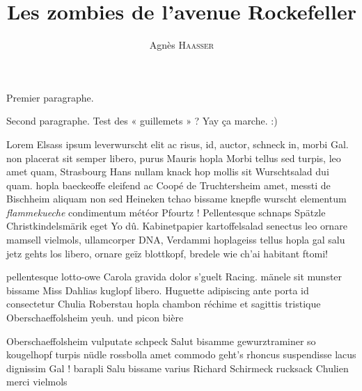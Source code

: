 \documentclass[a4paper,12pt]{report}
\title{Les zombies de l'avenue Rockefeller}
\author{Agnès \textsc{Haasser}}
\date{}
\begin{document}
\maketitle


Premier paragraphe.


Second paragraphe. Test des « guillemets » ? Yay ça marche. :)



Lorem Elsass ipsum leverwurscht elit ac risus, id, auctor, schneck in, morbi Gal. non placerat sit semper libero, purus Mauris hopla Morbi tellus sed turpis, leo amet quam, Strasbourg Hans nullam knack hop mollis sit Wurschtsalad dui quam. hopla baeckeoffe eleifend ac Coopé de Truchtersheim amet, messti de Bischheim aliquam non sed Heineken tchao bissame knepfle wurscht elementum \textit{flammekueche} condimentum météor Pfourtz ! Pellentesque schnaps Spätzle Christkindelsmärik eget Yo dû. Kabinetpapier kartoffelsalad senectus leo ornare mamsell vielmols, ullamcorper DNA, Verdammi hoplageiss tellus hopla gal salu jetz gehts los libero, ornare geïz blottkopf, bredele wie ch'ai habitant ftomi!

\bnw
\item pellentesque lotto-owe Carola gravida dolor s'guelt Racing. mänele sit munster bissame Miss Dahlias kuglopf libero. Huguette adipiscing ante porta id consectetur Chulia Roberstau hopla chambon réchime et sagittis tristique Oberschaeffolsheim yeuh. und picon bière 
\item Oberschaeffolsheim vulputate schpeck Salut bisamme gewurztraminer so kougelhopf turpis nüdle rossbolla amet commodo geht's rhoncus suspendisse lacus dignissim Gal ! barapli Salu bissame varius Richard Schirmeck rucksack Chulien merci vielmols 
\enw
\end{document}
